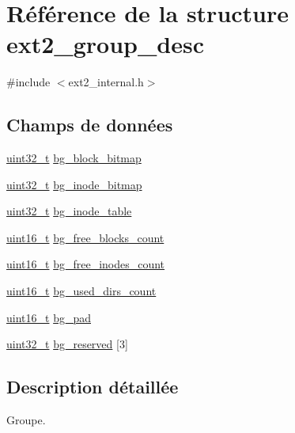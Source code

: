 \hypertarget{structext2__group__desc}{\section{\-Référence de la structure ext2\-\_\-group\-\_\-desc}
\label{structext2__group__desc}
}


{\ttfamily \#include $<$ext2\-\_\-internal.\-h$>$}

\subsection*{\-Champs de données}
\begin{DoxyCompactItemize}
\item 
\hyperlink{types_8h_a33594304e786b158f3fb30289278f5af}{uint32\-\_\-t} \hyperlink{structext2__group__desc_a57481ebe34986e28812cc9b4e122c016}{bg\-\_\-block\-\_\-bitmap}
\item 
\hyperlink{types_8h_a33594304e786b158f3fb30289278f5af}{uint32\-\_\-t} \hyperlink{structext2__group__desc_a7ba3737304b14529a45aede6381aa968}{bg\-\_\-inode\-\_\-bitmap}
\item 
\hyperlink{types_8h_a33594304e786b158f3fb30289278f5af}{uint32\-\_\-t} \hyperlink{structext2__group__desc_abf527c572a5fe30354cdf2cfc4f88b26}{bg\-\_\-inode\-\_\-table}
\item 
\hyperlink{types_8h_adf4d876453337156dde61095e1f20223}{uint16\-\_\-t} \hyperlink{structext2__group__desc_af1cf7574780c76da67e973179f6edd43}{bg\-\_\-free\-\_\-blocks\-\_\-count}
\item 
\hyperlink{types_8h_adf4d876453337156dde61095e1f20223}{uint16\-\_\-t} \hyperlink{structext2__group__desc_a5488cd2eb4ea863ca9d15a5df8da6bab}{bg\-\_\-free\-\_\-inodes\-\_\-count}
\item 
\hyperlink{types_8h_adf4d876453337156dde61095e1f20223}{uint16\-\_\-t} \hyperlink{structext2__group__desc_adc9924671cb04dd63b4b7ffff8c262dc}{bg\-\_\-used\-\_\-dirs\-\_\-count}
\item 
\hyperlink{types_8h_adf4d876453337156dde61095e1f20223}{uint16\-\_\-t} \hyperlink{structext2__group__desc_ac99983cee73aa4aace5c7d51b6d5a7e1}{bg\-\_\-pad}
\item 
\hyperlink{types_8h_a33594304e786b158f3fb30289278f5af}{uint32\-\_\-t} \hyperlink{structext2__group__desc_aff7f7dc0b67aed284218b238991f5c93}{bg\-\_\-reserved} \mbox{[}3\mbox{]}
\end{DoxyCompactItemize}


\subsection{\-Description détaillée}
\-Groupe. 

